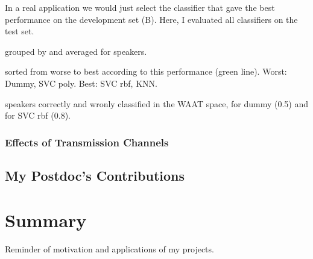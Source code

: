 \documentclass[a4paper]{article}
\begin{document}
In a real application we would just select the classifier that gave the best performance on the development set (B). Here, I evaluated all classifiers on the test set.

grouped by and averaged for speakers.

sorted from worse to best according to this performance (green line). Worst: Dummy, SVC poly. Best: SVC rbf, KNN.

speakers correctly and wronly classified in the WAAT space, for dummy (0.5) and for SVC rbf (0.8).

\subsubsection{Effects of Transmission Channels}

\subsection{My Postdoc's Contributions}



\section{Summary}

Reminder of motivation and applications of my projects.





% 

% 

\end{document}
